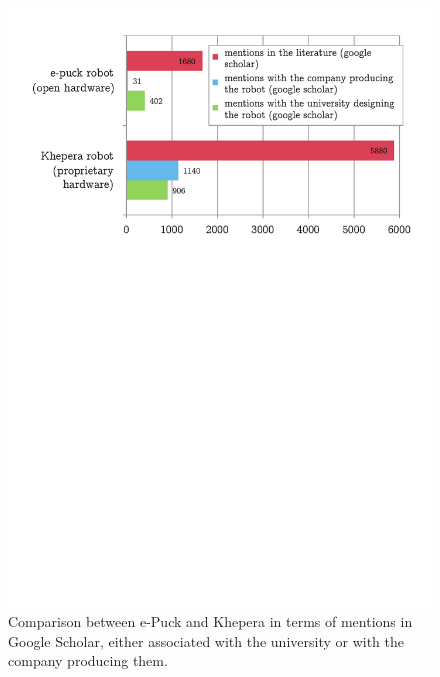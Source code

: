 \documentclass[letterpaper, 10 pt, conference]{ieeeconf}  %
\begin{document}
\begin{figure}
\centering
\includegraphics[width=\columnwidth]{figures/others_robots}
\caption{Comparison between e-Puck and Khepera in terms of mentions in Google Scholar, either associated with the university or with the company producing them.
}
\label{fig:khepuck}
\end{figure}
\end{document}
